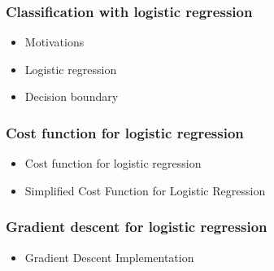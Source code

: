 \subsubsection*{Classification with logistic regression}
\begin{itemize}
  \item Motivations
  \item Logistic regression
  \item Decision boundary
\end{itemize}

\subsubsection*{Cost function for logistic regression}
\begin{itemize}
  \item Cost function for logistic regression
  \item Simplified Cost Function for Logistic Regression
\end{itemize}

\subsubsection*{Gradient descent for logistic regression}
\begin{itemize}
  \item Gradient Descent Implementation
\end{itemize}
